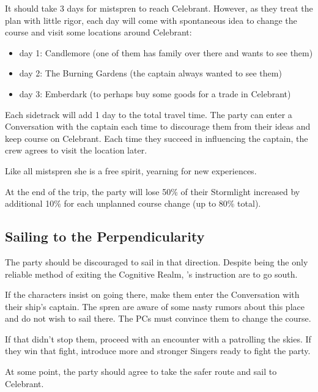 It should take 3 days for mistspren to reach Celebrant. However, as they treat the plan with little rigor, each day will come with spontaneous idea to change the course and visit some locations around Celebrant:

\begin{itemize}
	\item day 1: Candlemore (one of them has family over there and wants to see them)
	\item day 2: The Burning Gardens (the captain always wanted to see them)
	\item day 3: Emberdark (to perhaps buy some goods for a trade in Celebrant)
\end{itemize}

Each sidetrack will add 1 day to the total travel time. The party can enter a Conversation with the captain each time to discourage them from their ideas and keep course on Celebrant. Each time they succeed in influencing the captain, the crew agrees to visit the location later.

 Like all mistspren she is a free spirit, yearning for new experiences.


At the end of the trip, the party will lose 50\% of their Stormlight increased by additional 10\% for each unplanned course change (up to 80\% total).



\subsection{Sailing to the Perpendicularity}

The party should be discouraged to sail in that direction. Despite being the only reliable method of exiting the Cognitive Realm, \npcSjaAnat{}'s instruction are to go south.

If the characters insist on going there, make them enter the Conversation with their ship's captain. The spren are aware of some nasty rumors about this place and do not wish to sail there. The PCs must convince them to change the course.

If that didn't stop them, proceed with an encounter with a \enemySingerHaevenlyOne{} patrolling the skies. If they win that fight, introduce more and stronger Singers ready to fight the party.

At some point, the party should agree to take the safer route and sail to Celebrant.